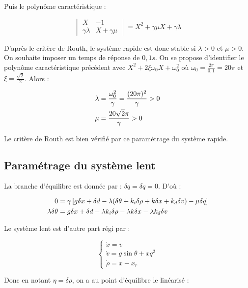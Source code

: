 \documentclass[10pt]{article}
\begin{document}
\noindent Puis le polynôme caractéristique :

\[
	\begin{vmatrix}
		X & -1 \\
		\gamma \lambda & X + \gamma \mu
	\end{vmatrix}
	= X^2 + \gamma \mu X + \gamma \lambda
\]

\noindent D'après le critère de Routh, le système rapide est donc stable si $\lambda > 0$ et $\mu > 0$. On souhaite
imposer un temps de réponse de $0,1 s$. On se propose d'identifier le polynôme caractéristique précédent avec
$X^2 + 2 \xi \omega_0 X + \omega_0^2$ où $\omega_0 = \frac{2 \pi}{0,1} = 20 \pi$ et $\xi = \frac{\sqrt 2}{2}$.
Alors :

\begin{align}
	\lambda &= \frac{\omega_0^2}{\gamma} = \frac{(20 \pi)^2}{\gamma} > 0 \notag \\
	\mu &= \frac{20 \sqrt 2 \pi}{\gamma} > 0 \notag
\end{align}

\noindent Le critère de Routh est bien vérifié par ce paramétrage du système rapide.

\subsection*{Paramétrage du système lent}

\noindent La branche d'équilibre est donnée par : $\delta q= \delta \dot q = 0$. D'où :

\begin{align}
	0 &= \gamma \left[ g \delta x + \delta d - \lambda ( \delta \theta + k_i \delta \rho + k \delta x + k_d \delta v )
	- \mu \delta q \right] \notag \\
	\lambda \delta \theta &= g \delta x + \delta d - \lambda k_i \delta \rho - \lambda k \delta x - \lambda k_d \delta v \notag 
\end{align}

\noindent Le système lent est d'autre part régi par :

\[
	 \begin{cases}
	 	\dot x = v \\
		\dot v = g \sin \theta + x q^2 \\
		\dot \rho = x - x_r
	\end{cases}
\]

\noindent Donc en notant $\eta = \delta \rho$, on a au point d'équilibre le linéarisé :
\end{document}
